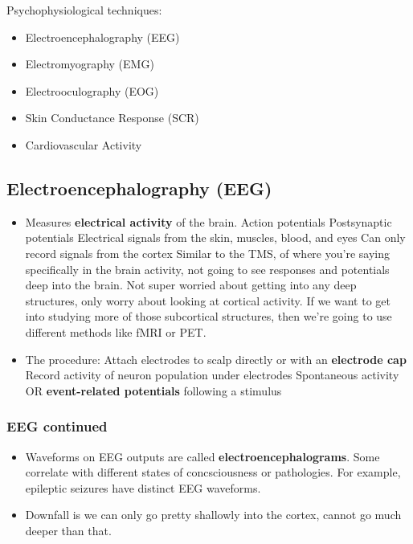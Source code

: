 \documentclass[12pt,a4paper]{article}
\begin{document}
	 Psychophysiological techniques:
	 \begin{itemize}
	 	\item Electroencephalography (EEG)
	 	\item Electromyography (EMG)
	 	\item Electrooculography (EOG)
	 	\item Skin Conductance Response (SCR)
	 	\item Cardiovascular Activity
	 \end{itemize}
	 
	 \subsection{Electroencephalography (EEG)}
	 
	 \begin{itemize}
	 	\item Measures \textbf{electrical activity} of the brain. 
	 	\subitem Action potentials 
	 	\subitem Postsynaptic potentials
	 	\subitem Electrical signals from the skin, muscles, blood, and eyes
	 	\subitem Can only record signals from the cortex
	 	\subsubitem Similar to the TMS, of where you're saying specifically in the brain activity, not going to see responses and potentials deep into the brain. 
	 	\subsubitem Not super worried about getting into any deep structures, only worry about looking at cortical activity. 
	 	\subsubitem If we want to get into studying more of those subcortical structures, then we're going to use different methods like fMRI or PET. 
	 	\item The procedure:
	 	\subitem Attach electrodes to scalp directly or with an \textbf{electrode cap}
	 	\subitem Record activity of neuron population under electrodes
	 	\subsubitem Spontaneous activity OR \textbf{event-related potentials} following a stimulus
	 \end{itemize}
	 
	 \subsubsection{EEG continued}
	 
	 \begin{itemize}
	 	\item Waveforms on EEG outputs are called \textbf{electroencephalograms}.
	 	\subitem Some correlate with different states of concsciousness or pathologies. 
	 	\subsubitem For example, epileptic seizures have distinct EEG waveforms. 
	 	\item Downfall is we can only go pretty shallowly into the cortex, cannot go much deeper than that. 
	 \end{itemize}
	 
\end{document}
